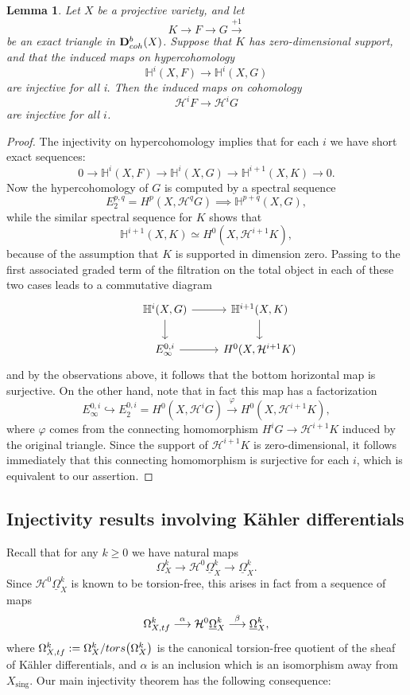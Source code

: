\documentclass[11pt]{amsart}
\newtheorem{lemma}[equation]{Lemma}
\theoremstyle{definition}
\theoremstyle{plain}
\renewcommand{\H}{\mathcal H}
\newcommand{\HH}{\mathbb H}
\newcommand{\DD}{\mathbf D}
\newcommand{\DB}{\underline{\Omega}} %
\DeclareMathOperator{\sing}{sing}
\begin{document}
\begin{lemma}
Let $X$ be a projective variety, and let
$$K \to F \to G \overset{+1}{\longrightarrow}$$ 
be an exact triangle in $\DD^b_{\rm coh} (X)$. Suppose that $K$ has zero-dimensional support, and that the induced maps on 
hypercohomology 
$$\HH^i (X, F) \to \HH^i (X, G)$$
are injective for all i. Then the induced maps on cohomology 
$$\H^i F \to \H^i G$$
are injective for all $i$.
\end{lemma}
\begin{proof}
The injectivity on hypercohomology implies that for each $i$ we have short exact sequences:
$$0 \to \HH^i (X, F) \to \HH^i (X, G) \to \HH^{i +1} (X, K) \to 0.$$
Now the hypercohomology of $G$ is computed by a spectral sequence
$$E^{p,q}_2 = H^p(X, \H^q G) \implies \HH^{p+q}(X, G),$$
while the similar spectral sequence for $K$ shows that 
$$\HH^{i+1} (X, K) \simeq H^0 (X, \H^{i +1} K),$$
because of the assumption that $K$ is supported in dimension zero. Passing to the first associated graded term of the filtration on the total object 
in each of these two cases leads to a commutative diagram
   \[\begin{tikzcd}
        &\HH^i(X, G)\ar[d] \ar[r]& \HH^{i + 1} (X, K)\ar[d] \\
        &E^{0, i}_\infty \ar[r]& H^0 (X, \H^{i +1} K)
    \end{tikzcd}\]
and by the observations above, it follows that the bottom horizontal map is surjective. On the other hand, note that in fact this map has a factorization
$$E^{0, i}_\infty \hookrightarrow E^{0, i}_2 = H^0 (X, \H^i G) \overset{\varphi}{\longrightarrow}  H^0 (X, \H^{i +1}  K),$$
where $\varphi$ comes from the connecting homomorphism $H^i G \to \H^{i +1} K$ induced by the original triangle. Since the support of $\H^{i+1} K$ is zero-dimensional, it follows immediately that this connecting homomorphism is surjective for each $i$, which is equivalent to our assertion.
\end{proof}




\subsection{Injectivity results involving K\"ahler differentials}
Recall that for any $k \ge 0$ we have natural maps 
$$\Omega_X^k \longrightarrow \H^0\DB_X^k \longrightarrow \DB_X^k.$$
Since $\H^0\DB_X^k$ is known to be torsion-free, this arises in fact from a sequence of maps 
 \begin{equation}\label{eqn:composition-tf}
 \Omega_{X, {\rm tf}}^k \overset{\alpha}{\longrightarrow} \H^0\DB_X^k \overset{\beta}{\longrightarrow} \DB_X^k,
 \end{equation}
 where $\Omega_{X, {\rm tf}}^k: = \Omega_X^k / {\rm tors} \big( \Omega_X^k \big)$ is the canonical torsion-free quotient of the sheaf of K\"ahler differentials, and $\alpha$ is an inclusion which is an isomorphism away from $X_{\sing}$. Our main injectivity theorem has the following consequence:
\end{document}
